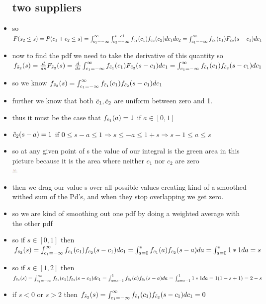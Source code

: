 \documentclass{article}
\begin{document}
\begin{itemize}
\subsection{two suppliers}
\item so $F(\Tilde{s}_{2}\leq s)=P(\Tilde{c}_{1}+\Tilde{c}_2\leq s)=\int_{c_{1}=-\infty}^{\infty}\int_{c_2=-\infty}^{s-c1}f_{\Tilde{c}_1}(c_1)f_{\Tilde{c}_2}(c_2)dc_{1}dc_{2}=\int_{c_{1}=-\infty}^{\infty}f_{\Tilde{c}_{1}}(c_1)F_{\Tilde{c}_2}(s-c_1)dc_1$
\item now to find the pdf we need to take the derivative of this quantity so $f_{\Tilde{s}_2}(s)=\frac{d}{ds}F_{\Tilde{s}_2}(s)=\frac{d}{ds}\int_{c_{1}=-\infty}^{\infty}f_{\Tilde{c}_{1}}(c_1)F_{\Tilde{c}_2}(s-c_1)dc_1=\int_{c_{1}=-\infty}^{\infty}f_{\Tilde{c}_{1}}(c_1)f_{\Tilde{c}_2}(s-c_1)dc_1$
\item so we know $f_{\Tilde{s}_2}(s)=\int_{c_{1}=-\infty}^{\infty}f_{\Tilde{c}_{1}}(c_1)f_{\Tilde{c}_2}(s-c_1)dc_1$
\item further we know that both $\Tilde{c}_{1}, \Tilde{c}_{2}$ are uniform between zero and 1. 
\item thus it must be the case that $f_{\Tilde{c}_{1}}(a)=1$ if $a\in [0,1]$
\item$\Tilde{c}_{2}(s-a)=1$ if $0\leq s-a\leq 1\Rightarrow s\leq -a\leq 1+s\Rightarrow s-1\leq a\leq s$
\item so at any given point of s the value of our integral is the green area in this picture because it is the area where neither $c_1$ nor $c_2$ are zero \\\includegraphics[width=10]{notes/week_4/vidio 1: Why Sums And Averages Tend To Look Gaussian/immages/v1_5.jpg}
\item then we drag our value s over all possible values creating kind of a smoothed withed sum of the Pd's, and when they stop overlapping we get zero. 
\item so we are kind of smoothing out one pdf by doing a weighted average with the other pdf
\item so if $s\in [0,1]$ then $f_{\Tilde{s}_2}(s)=\int_{c_{1}=-\infty}^{\infty}f_{\Tilde{c}_{1}}(c_1)f_{\Tilde{c}_2}(s-c_1)dc_1=\int_{a=0}^{s}f_{\Tilde{c}_{1}}(a)f_{\Tilde{c}_2}(s-a)da=\int_{a=0}^{s}1*1da=s$
\item so if $s\in [1,2]$ then $f_{\Tilde{s}_2}(s)=\int_{c_{1}=-\infty}^{\infty}f_{\Tilde{c}_{1}}(c_1)f_{\Tilde{c}_2}(s-c_1)dc_1=\int_{a=s-1}^{1}f_{\Tilde{c}_{1}}(a)f_{\Tilde{c}_2}(s-a)da=\int_{a=s-1}^{1}1*1da=1(1-s+1)=2-s$
\item if $s<0 \text{ or } s>2$ then $f_{\Tilde{s}_2}(s)=\int_{c_{1}=-\infty}^{\infty}f_{\Tilde{c}_{1}}(c_1)f_{\Tilde{c}_2}(s-c_1)dc_1=0$

\end{itemize}
\end{document}
